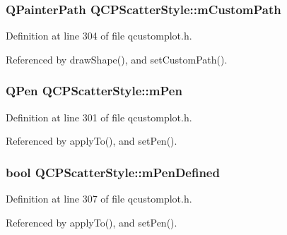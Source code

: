 \subsubsection[{m\+Custom\+Path}]{\setlength{\rightskip}{0pt plus 5cm}Q\+Painter\+Path Q\+C\+P\+Scatter\+Style\+::m\+Custom\+Path\hspace{0.3cm}{\ttfamily [protected]}}\label{class_q_c_p_scatter_style_a813cb074744dc5a2f59cc99d6a10c6f0}


Definition at line 304 of file qcustomplot.\+h.



Referenced by draw\+Shape(), and set\+Custom\+Path().

\hypertarget{class_q_c_p_scatter_style_a0f6a85e6d1e3ae1ca1b6efb4d4cdfe17}{}
\subsubsection[{m\+Pen}]{\setlength{\rightskip}{0pt plus 5cm}Q\+Pen Q\+C\+P\+Scatter\+Style\+::m\+Pen\hspace{0.3cm}{\ttfamily [protected]}}\label{class_q_c_p_scatter_style_a0f6a85e6d1e3ae1ca1b6efb4d4cdfe17}


Definition at line 301 of file qcustomplot.\+h.



Referenced by apply\+To(), and set\+Pen().

\hypertarget{class_q_c_p_scatter_style_a84ef5aa591ddba07b440f597e1669e78}{}
\subsubsection[{m\+Pen\+Defined}]{\setlength{\rightskip}{0pt plus 5cm}bool Q\+C\+P\+Scatter\+Style\+::m\+Pen\+Defined\hspace{0.3cm}{\ttfamily [protected]}}\label{class_q_c_p_scatter_style_a84ef5aa591ddba07b440f597e1669e78}


Definition at line 307 of file qcustomplot.\+h.



Referenced by apply\+To(), and set\+Pen().

\hypertarget{class_q_c_p_scatter_style_a7697346c89b19d4cd1d8dd33319ec9e3}{}
